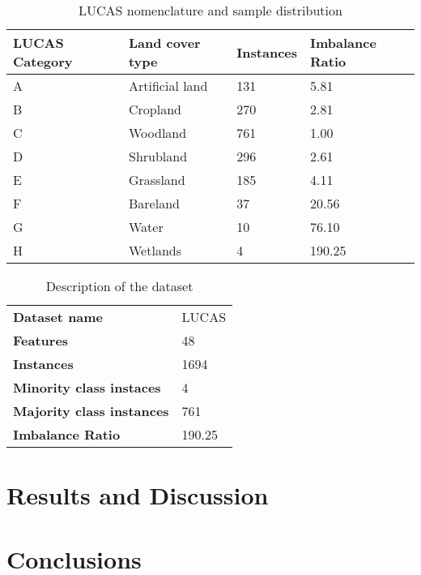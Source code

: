 \documentclass[parskip=full]{scrartcl}
\begin{document}
\begin{table}[H]
	\centering
	\begin{tabular}{|p{2.2cm}|p{2.3cm}|p{2cm}|p{2cm}|}
		\hline
		\textbf{LUCAS Category} & \textbf{Land cover type} & \textbf{Instances}
		& \textbf{Imbalance Ratio} \\
		\hline
		A & Artificial land& 131 & 5.81 \\
		\hline
		B & Cropland & 270 & 2.81 \\
		\hline
		C & Woodland & 761 & 1.00 \\
		\hline
		D & Shrubland & 296 & 2.61 \\
		\hline
		E & Grassland & 185 & 4.11 \\
		\hline
		F & Bareland & 37 & 20.56 \\
		\hline
		G & Water & 10 & 76.10 \\
		\hline
		H & Wetlands & 4 &  190.25\\
		\hline
	\end{tabular}
	\caption{\label{tab:dataset_classes}LUCAS nomenclature and sample distribution}
\end{table}


\begin{table}[H]
	\centering
	\begin{tabular}{ll}
		\toprule
		\textbf{Dataset name}             &  				 LUCAS \\
		\textbf{Features}                 &             48 \\
		\textbf{Instances}                &           1694 \\
		\textbf{Minority class instaces}  &              4 \\
		\textbf{Majority class instances} &            761 \\
		\textbf{Imbalance Ratio}          &         190.25 \\
	\bottomrule
	\end{tabular}
	\caption{\label{tab:datasets}Description of the dataset}
\end{table}

\section{Results and Discussion}

\section{Conclusions}





\end{document}
